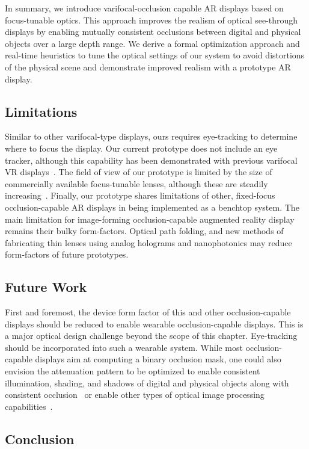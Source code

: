 In summary, we introduce varifocal-occlusion capable AR displays based on focus-tunable optics. This approach improves the realism of optical see-through displays by enabling mutually consistent occlusions between digital and physical objects over a large depth range. We derive a formal optimization approach and real-time heuristics to tune the optical settings of our system to avoid distortions of the physical scene and demonstrate improved realism with a prototype AR display. 

\subsection{Limitations}

Similar to other varifocal-type displays, ours requires eye-tracking to determine where to focus the display. 
Our current prototype does not include an eye tracker, although this capability has been demonstrated with previous varifocal VR displays~\cite{Padmanaban2016Optimizing}. 
The field of view of our prototype is limited by the size of commercially available focus-tunable lenses, although these are steadily increasing~\cite{Padmanaban2019Autofocals}. 
Finally, our prototype shares limitations of other, fixed-focus occlusion-capable AR displays in being implemented as a benchtop system. 
The main limitation for image-forming occlusion-capable augmented reality display remains their bulky form-factors.
Optical path folding, and new methods of fabricating thin lenses using analog holograms and nanophotonics may reduce form-factors of future prototypes. 

\subsection{Future Work}

First and foremost, the device form factor of this and other occlusion-capable displays should be reduced to enable wearable occlusion-capable displays. This is a major optical design challenge beyond the scope of this chapter. Eye-tracking should be incorporated into such a wearable system. While most occlusion-capable displays aim at computing a binary occlusion mask, one could also envision the attenuation pattern to be optimized to enable consistent illumination, shading, and shadows of digital and physical objects along with consistent occlusion~\cite{bimber2003consistent} or enable other types of optical image processing capabilities~\cite{Wetzstein2010}. 

\subsection{Conclusion}

